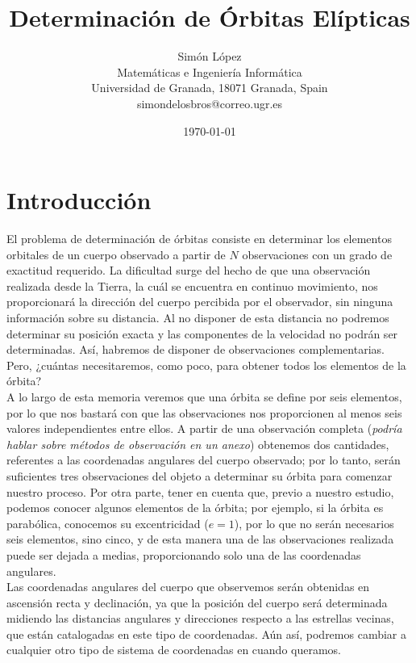 \documentclass[11pt]{article}
\title{Determinación de Órbitas Elípticas}
\author{Simón López
\\
{\small Matemáticas e Ingeniería Informática}
\\
{\small Universidad de Granada, 18071 Granada, Spain}
\\
{\small simondelosbros@correo.ugr.es}}
\date{\today}
\begin{document}
\maketitle

\section{Introducción}

El problema de determinación de órbitas consiste en determinar los elementos orbitales de un cuerpo observado a partir de $N$ observaciones con un grado de exactitud requerido. La dificultad surge del hecho de que una observación realizada desde la Tierra, la cuál se encuentra en continuo movimiento, nos proporcionará la dirección del cuerpo percibida por el observador, sin ninguna información sobre su distancia. Al no disponer de esta distancia no podremos determinar su posición exacta y las componentes de la velocidad no podrán ser determinadas. Así, habremos de disponer de observaciones complementarias. Pero, ¿cuántas necesitaremos, como poco, para obtener todos los elementos de la órbita?\\

A lo largo de esta memoria veremos que una órbita se define por seis elementos, por lo que nos bastará con que las observaciones nos proporcionen al menos seis valores independientes entre ellos. A partir de una observación completa (\textit{podría hablar sobre métodos de observación en un anexo}) obtenemos dos cantidades, referentes a las coordenadas angulares del cuerpo observado; por lo tanto, serán suficientes tres observaciones del objeto a determinar su órbita para comenzar nuestro proceso. Por otra parte, tener en cuenta que, previo a nuestro estudio, podemos conocer algunos elementos de la órbita; por ejemplo, si la órbita es parabólica, conocemos su excentricidad ($e=1$), por lo que no serán necesarios seis elementos, sino cinco, y de esta manera una de las observaciones realizada puede ser dejada a medias, proporcionando solo una de las coordenadas angulares.\\

Las coordenadas angulares del cuerpo que observemos serán obtenidas en ascensión recta y declinación, ya que la posición del cuerpo será determinada midiendo las distancias angulares y direcciones respecto a las estrellas vecinas, que están catalogadas en este tipo de coordenadas. Aún así, podremos cambiar a cualquier otro tipo de sistema de coordenadas en cuando queramos.\\
\end{document}
